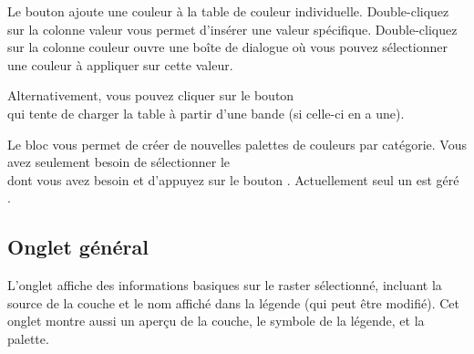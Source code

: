 Le bouton  ajoute une couleur à la table de couleur individuelle. Double-cliquez sur la colonne valeur vous permet d'insérer une valeur spécifique. Double-cliquez sur la colonne couleur ouvre une boîte de dialogue   où vous pouvez sélectionner une couleur à appliquer sur cette valeur.

Alternativement, vous pouvez cliquer sur le bouton\\
  qui tente de charger la table à partir d'une bande (si celle-ci en a une).

Le bloc  vous permet de créer de nouvelles palettes de couleurs par catégorie. Vous avez seulement besoin de sélectionner le\\  dont vous avez besoin et d'appuyez sur le bouton . Actuellement seul un  est géré .

\subsection{Onglet général}\label{label_generaltab}

L'onglet  affiche des informations basiques sur le raster
sélectionné, incluant la source de la couche et le nom affiché dans la légende (qui peut être modifié). Cet onglet montre aussi un aperçu de la couche, le symbole de la légende, et la palette.

